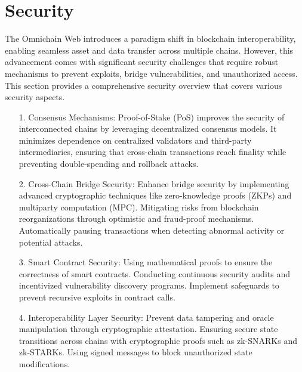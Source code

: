 

\section{Security}

The Omnichain Web introduces a paradigm shift in blockchain interoperability, enabling seamless asset and data transfer across multiple chains. However, this advancement comes with significant security challenges that require robust mechanisms to prevent exploits, bridge vulnerabilities, and unauthorized access. This section provides a comprehensive security overview that covers various security aspects.

\begin{itemize}
    \item[1.] Consensus Mechanisms: Proof-of-Stake (PoS) improves the security of interconnected chains by leveraging decentralized consensus models. It minimizes dependence on centralized validators and third-party intermediaries, ensuring that cross-chain transactions reach finality while preventing double-spending and rollback attacks.
    
    \item[2.] Cross-Chain Bridge Security: Enhance bridge security by implementing advanced cryptographic techniques like zero-knowledge proofs (ZKPs) and multiparty computation (MPC). Mitigating risks from blockchain reorganizations through optimistic and fraud-proof mechanisms. Automatically pausing transactions when detecting abnormal activity or potential attacks.

    \item[3.] Smart Contract Security: Using mathematical proofs to ensure the correctness of smart contracts. Conducting continuous security audits and incentivized vulnerability discovery programs. Implement safeguards to prevent recursive exploits in contract calls.

    \item[4.] Interoperability Layer Security: Prevent data tampering and oracle manipulation through cryptographic attestation. Ensuring secure state transitions across chains with cryptographic proofs such as zk-SNARKs and zk-STARKs. Using signed messages to block unauthorized state modifications.
\end{itemize}



